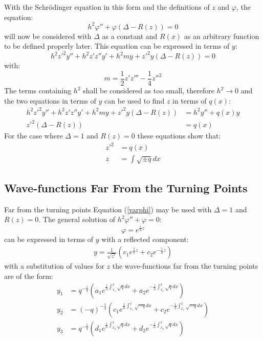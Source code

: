 		With the Schr{\" o}dinger equation in this form and the definitions of $z$ and $\varphi$, the equation:
		\begin{equation}
			h^{2}\varphi''+\varphi\left(\Delta-R\left(z\right)\right)=0
			\label{varphi}
		\end{equation}
		will now be considered with $\Delta$ as a constant and $R\left(x\right)$ as an arbitrary function to be defined properly later. This equation can be expressed in terms of $y$:
		\begin{equation}
			h^{2}z'^{2}y''+h^{2}z'z''y'+h^{2}my+z'^{2}y\left(\Delta-R\left(z\right)\right)=0
		\end{equation}
		with:
		\begin{equation}
			m=\frac{1}{2}z'z'''-\frac{1}{4}z''^{2}
		\end{equation}
		The terms containing $h^{2}$ shall be considered as too small, therefore $h^{2}\rightarrow0$ and the two equations in terms of $y$ can be used to find $z$ in terms of $q(x)$:
		\begin{align}
			h^{2}z'^{2}y''+h^{2}z'z''y'+h^{2}my+z'^{2}y\left(\Delta-R\left(z\right)\right)&=h^{2}y''+q\left(x\right)y\\
			z'^{2}\left(\Delta-R\left(z\right)\right)&=q\left(x\right)
		\end{align}
		For the case where $\Delta=1$ and $R\left(z\right)=0$ these equations show that:
		\begin{align}
			z'^{2}&=q\left(x\right)\\
			z&=\int \sqrt{\pm q} dx
		\end{align}
		\subsection{Wave-functions Far From the Turning Points}
		\label{Appendix - Wave-functions Far From the Turning Points}
		Far from the turning points Equation (\ref{varphi}) may be used with $\Delta=1$ and $R\left(z\right)=0$. The general solution of $h^{2}\varphi''+\varphi=0$:
		\begin{equation}
			\varphi=e^{\frac{i}{h}z}
		\end{equation}
		can be expressed in terms of $y$ with a reflected component:
		\begin{align}
			y=\frac{1}{\sqrt{z'}}\left(c_{1}e^{\frac{i}{h}z}+c_{2}e^{-\frac{i}{h}z}\right)
		\end{align}
		with a substitution of values for $z$ the wave-functions far from the turning points are of the form:
		\begin{align}
			y_{1}&= q^{-\frac{1}{4}}\left(a_{1}e^{\frac{i}{h}\int_{x_{1}}^x \sqrt{q} dx}+a_{2}e^{-\frac{i}{h}\int_{x_{1}}^x \sqrt{q} dx}\right)\\
			y_{2}&= \left(-q\right)^{-\frac{1}{4}}\left(c_{1}e^{\frac{1}{h}\int_{x_{1}}^x \sqrt{-q}dx}+c_{2}e^{-\frac{1}{h}\int_{x_{1}}^x \sqrt{-q}dx}\right)\\
			y_{3}&= q^{-\frac{1}{4}}\left(d_{1}e^{\frac{i}{h}\int_{x_{2}}^x \sqrt{q} dx}+d_{2}e^{-\frac{i}{h}\int_{x_{2}}^x \sqrt{q} dx}\right)
		\end{align}
